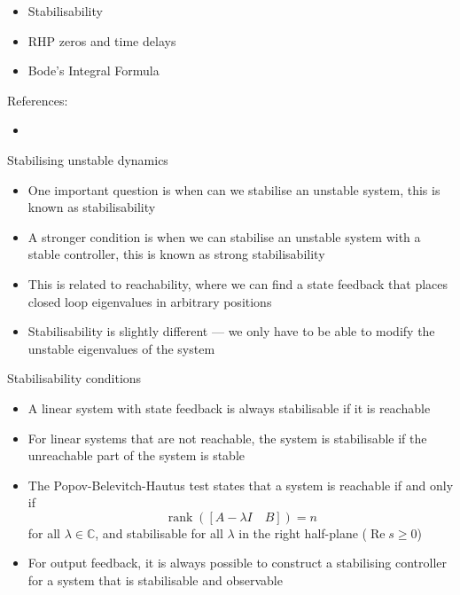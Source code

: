 \documentclass{beamer-control}
\begin{document}

\begin{SUMMARY}
\begin{itemize}
\item Stabilisability
\item RHP zeros and time delays
\item Bode's Integral Formula
\end{itemize}
\vfill References:
\begin{itemize}
\item {}
\end{itemize}
\end{SUMMARY}




\begin{frame}{Stabilising unstable dynamics}
\begin{itemize}
\item One important question is when can we stabilise an unstable system, this is known as stabilisability
\item A stronger condition is when we can stabilise an unstable system with a stable controller, this is known as strong stabilisability
\item This is related to reachability, where we can find a state feedback that places closed loop eigenvalues in arbitrary positions
\item Stabilisability is slightly different --- we only have to be able to modify the unstable eigenvalues of the system
\end{itemize}
\end{frame}

\begin{frame}{Stabilisability conditions}
	\begin{itemize}
		\item A linear system with state feedback is always stabilisable if it is reachable
		\item For linear systems that are not reachable, the system is stabilisable if the unreachable part of the system is stable
		\item The Popov-Belevitch-Hautus test states that a system is reachable if and only if 
		\[\operatorname{rank}([A-\lambda I \quad B]) = n\]
		for all $\lambda\in\mathbb{C}$, and stabilisable for all $\lambda$ in the right half-plane ($\operatorname{Re} s \geq 0$)
		\item For output feedback, it is always possible to construct a stabilising controller for a system that is stabilisable and observable
	\end{itemize}
\end{frame}
\end{document}
